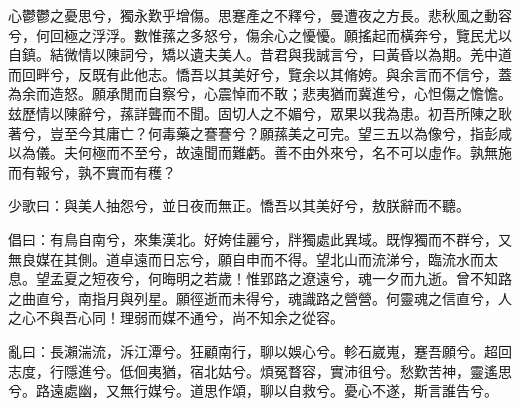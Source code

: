 
\begin{pinyinscope}
心鬱鬱之憂思兮，獨永歎乎增傷。思蹇產之不釋兮，曼遭夜之方長。悲秋風之動容兮，何回極之浮浮。數惟蓀之多怒兮，傷余心之懮懮。願搖起而橫奔兮，覽民尤以自鎮。結微情以陳詞兮，矯以遺夫美人。昔君與我誠言兮，曰黃昏以為期。羌中道而回畔兮，反既有此他志。憍吾以其美好兮，覽余以其脩姱。與余言而不信兮，蓋為余而造怒。願承閒而自察兮，心震悼而不敢；悲夷猶而冀進兮，心怛傷之憺憺。玆歷情以陳辭兮，蓀詳聾而不聞。固切人之不媚兮，眾果以我為患。初吾所陳之耿著兮，豈至今其庸亡？何毒藥之謇謇兮？願蓀美之可完。望三五以為像兮，指彭咸以為儀。夫何極而不至兮，故遠聞而難虧。善不由外來兮，名不可以虛作。孰無施而有報兮，孰不實而有穫？

少歌曰：與美人抽怨兮，並日夜而無正。憍吾以其美好兮，敖朕辭而不聽。

倡曰：有鳥自南兮，來集漢北。好姱佳麗兮，牉獨處此異域。既惸獨而不群兮，又無良媒在其側。道卓遠而日忘兮，願自申而不得。望北山而流涕兮，臨流水而太息。望孟夏之短夜兮，何晦明之若歲！惟郢路之遼遠兮，魂一夕而九逝。曾不知路之曲直兮，南指月與列星。願徑逝而未得兮，魂識路之營營。何靈魂之信直兮，人之心不與吾心同！理弱而媒不通兮，尚不知余之從容。

亂曰：長瀨湍流，泝江潭兮。狂顧南行，聊以娛心兮。軫石崴嵬，蹇吾願兮。超回志度，行隱進兮。低佪夷猶，宿北姑兮。煩冤瞀容，實沛徂兮。愁歎苦神，靈遙思兮。路遠處幽，又無行媒兮。道思作頌，聊以自救兮。憂心不遂，斯言誰告兮。


\end{pinyinscope}